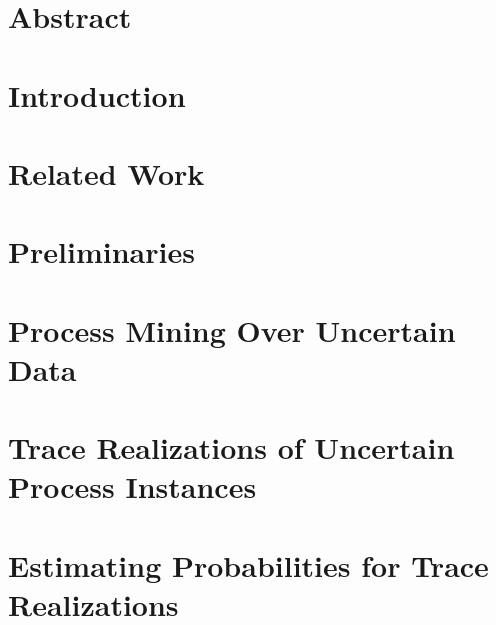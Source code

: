 \documentclass[a4paper,11pt,twoside]{pads-thesis}
\begin{document}

\gTitlePage

\chapter*{Abstract} 
\label{chap: abstract}

\tableofcontents

\cleardoublepage
\pagestyle{fancy}

\chapter{Introduction} \label{chap:intro}


\chapter{Related Work} \label{chap:related_work}


\chapter{Preliminaries} \label{chap:prelim}


\chapter{Process Mining Over Uncertain Data} \label{chap:fundamentals}


\chapter{Trace Realizations of Uncertain Process Instances} \label{chap:realizations}


\chapter{Estimating Probabilities for Trace Realizations}
\label{chap:estimates}



%
\end{document}
